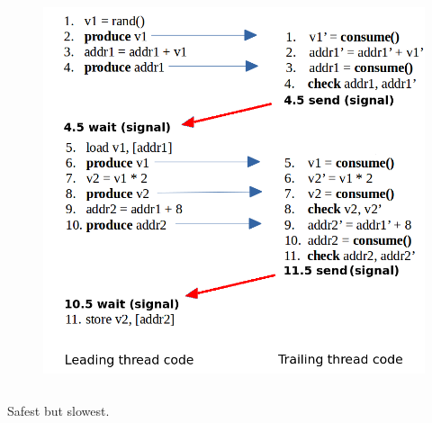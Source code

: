 \documentclass[xcolor=pdftex,dvipsnames,table]{beamer}
\begin{document}
\begin{frame}
\begin{columns}[c]
		\column{3in}        
        	\begin{figure}[H]
        		\begin{center}
        			\includegraphics[scale=0.3]{CodeTransformation-Cyclic.png}
         		\end{center}
        	\end{figure}
            
    \end{columns} \pause
    
    \begin{shaded} \centerline{Safest but slowest.} \end{shaded}
                
        
\end{frame}
\end{document}
